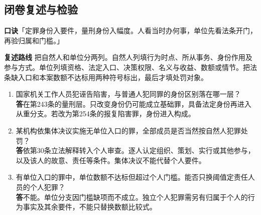 \subsection*{闭卷复述与检验}
\textbf{口诀}\quad「定罪身份入要件，量刑身份入幅度。人看当时办何事，单位先看法条开门，再验归属和门槛。」

\textbf{复述路线}\quad
把自然人和单位分两列。自然人列填行为时点、所从事务、身份作用及参与方式。单位列填资格、法定入口、决策权限、名义与收益、数额或情节。把法条缺入口和本案数额不达标用两种符号标出，最后才填处罚对象。

\begin{enumerate}
\item 国家机关工作人员犯诬告陷害，与普通人犯同罪的身份区别落在哪一层？\\
\textbf{答}\quad 在第243条的量刑层。只改变身份仍可能成立基础罪，具备法定身份再进入从重分支。若改为第254条的报复陷害罪，身份进入构成。
\item 某机构依集体决议实施无单位入口的罪，全部成员是否当然按自然人犯罪处罚？\\
\textbf{答}\quad 依第30条立法解释转入个人审查。逐人认定组织、策划、实行或其他参与，以及该人的故意、责任等条件。集体决议不能代替个人要件。
\item 有单位入口的罪中，单位数额不达标但超过个人门槛。能否只换阈值定责任人员的个人犯罪？\\
\textbf{答}\quad 不能。单位分支因门槛缺项而不成立。独立个人犯罪需另有归属于个人的行为事实及其余要件，不能只替换数额比较式。
\end{enumerate}
